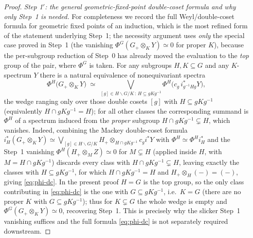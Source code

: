 \begin{proof}
\emph{Step 1$'$: the general geometric-fixed-point double-coset formula and why
only Step~1 is needed.} For completeness we record the full Weyl/double-coset
formula for geometric fixed points of an induction, which is the most refined
form of the statement underlying Step~1; the necessity argument uses \emph{only}
the special case proved in Step~1 (the vanishing $\Phi^G(G_+\otimes_K Y)\simeq0$
for proper $K$), because the per-subgroup reduction of Step~0 has already moved
the evaluation to the \emph{top} group of the pair, where $\Phi^G$ is taken. For
any subgroups $H,K\subseteq G$ and any $K$-spectrum $Y$ there is a natural
equivalence of nonequivariant spectra
\begin{equation}\label{eq:phi-dc}
\Phi^H\bigl(G_+\otimes_K Y\bigr)\;\simeq\;
\bigvee_{[g]\in H\backslash G/K\,:\,H\subseteq gKg^{-1}}
\Phi^{H}\bigl(c_g\,i^\ast_{g^{-1}Hg}Y\bigr),
\end{equation}
the wedge ranging only over those double cosets $[g]$ with $H\subseteq gKg^{-1}$
(equivalently $H\cap gKg^{-1}=H$); for all other classes the corresponding
summand is $\Phi^H$ of a spectrum induced from the \emph{proper} subgroup
$H\cap gKg^{-1}\subsetneq H$, which vanishes. Indeed, combining the Mackey
double-coset formula $i_H^\ast(G_+\otimes_K Y)\simeq\bigvee_{[g]\in H\backslash
G/K}H_+\otimes_{H\cap gKg^{-1}}c_g i^\ast Y$ with $\Phi^H\simeq\Phi^H i_H^\ast$
and the Step~1 vanishing $\Phi^H(H_+\otimes_M Z)\simeq0$ for $M\subsetneq H$
(applied inside $H$, with $M=H\cap gKg^{-1}$) discards every class with
$H\cap gKg^{-1}\subsetneq H$, leaving exactly the classes with $H\subseteq
gKg^{-1}$, for which $H\cap gKg^{-1}=H$ and $H_+\otimes_H(-)=(-)$, giving
\eqref{eq:phi-dc}. In the present proof $H=G$ is the top group, so the only class
contributing in \eqref{eq:phi-dc} is the one with $G\subseteq gKg^{-1}$, i.e.\
$K=G$ (there are no proper $K$ with $G\subseteq gKg^{-1}$); thus for $K\subsetneq
G$ the whole wedge is empty and $\Phi^G(G_+\otimes_K Y)\simeq0$, recovering
Step~1. This is precisely why the slicker Step~1 vanishing suffices and the full
formula \eqref{eq:phi-dc} is not separately required downstream.


\end{proof}
